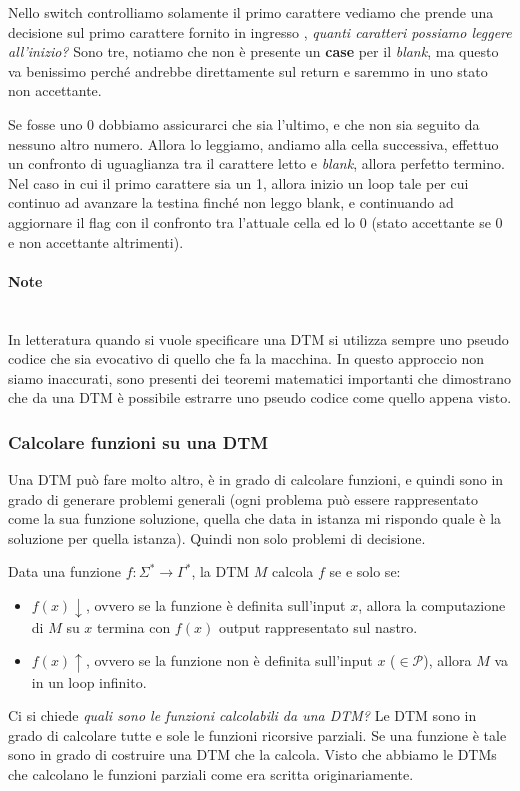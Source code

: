 \documentclass{article}
\begin{document}
Nello switch controlliamo
solamente il primo carattere vediamo che prende una decisione sul primo carattere fornito
in ingresso , \textit{quanti caratteri
    possiamo leggere all'inizio?} Sono tre, notiamo che non è presente un
\textbf{case} per il \textit{blank}, ma questo va benissimo perché andrebbe
direttamente sul return e saremmo in uno stato non accettante.

Se fosse uno 0 dobbiamo assicurarci che sia l'ultimo, e che non sia seguito
da nessuno altro numero. Allora lo leggiamo, andiamo alla cella successiva,
effettuo un confronto di uguaglianza tra il carattere letto e \textit{blank},
allora perfetto termino. Nel caso in cui il primo carattere sia un 1, allora
inizio un loop tale per cui continuo ad avanzare la testina finché non leggo
blank, e continuando ad aggiornare il flag con il confronto tra l'attuale
cella ed lo 0 (stato accettante se 0 e non accettante altrimenti).

\paragraph{Note}\mbox{}\\
In letteratura quando si vuole specificare una DTM si utilizza sempre uno
pseudo codice che sia evocativo di quello che fa la macchina. In questo approccio
non siamo inaccurati, sono presenti dei teoremi matematici importanti
che dimostrano che da una DTM è possibile estrarre uno pseudo codice
come quello appena visto.

\subsubsection{Calcolare funzioni su una DTM}
Una DTM può fare molto altro, è in grado di calcolare funzioni, e quindi
sono in grado di generare problemi generali (ogni problema può essere
rappresentato come la sua funzione soluzione, quella che data in istanza
mi rispondo quale è la soluzione per quella istanza). Quindi non solo
problemi di decisione.

Data una funzione $f:\Sigma^*\rightarrow\Gamma^*$, la DTM $M$ calcola $f$ se
e solo se:
\begin{itemize}
    \item $f(x)\downarrow$, ovvero se la funzione è definita sull'input $x$,
          allora la computazione di $M$ su $x$ termina con $f(x)$ output rappresentato
          sul nastro.

    \item $f(x)\uparrow$, ovvero se la funzione non è definita sull'input $x$ ($\in\mathcal{P}$), allora $M$ va in un
          loop infinito.
\end{itemize}
Ci si chiede \textit{quali sono le funzioni calcolabili da una DTM?} Le DTM
sono in grado di calcolare tutte e sole le funzioni ricorsive parziali. Se
una funzione è tale sono in grado di costruire una DTM che la calcola.
Visto che abbiamo le DTMs che calcolano le funzioni parziali come era scritta
originariamente.
\end{document}
